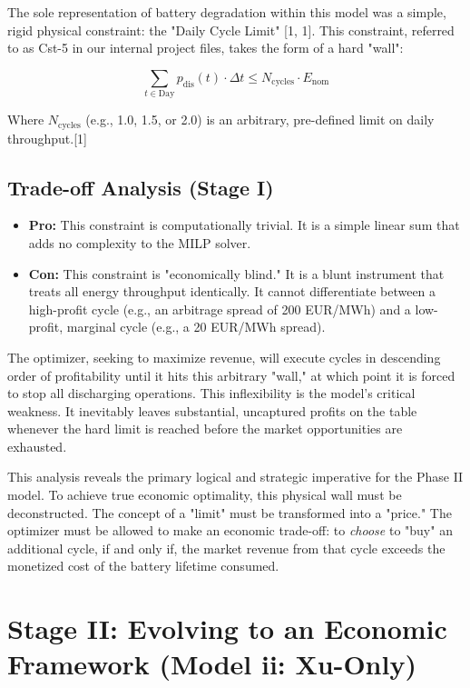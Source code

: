 \documentclass[11pt, a4paper]{article}
\begin{document}
The sole representation of battery degradation within this model was a simple, rigid physical constraint: the "Daily Cycle Limit" [1, 1]. This constraint, referred to as Cst-5 in our internal project files, takes the form of a hard "wall":

\begin{equation}
 \sum_{t \in \text{Day}} p_{\mathrm{dis}}(t) \cdot \Delta t \le N_{\mathrm{cycles}} \cdot E_{\mathrm{nom}}
\end{equation}

Where $N_{\mathrm{cycles}}$ (e.g., 1.0, 1.5, or 2.0) is an arbitrary, pre-defined limit on daily throughput.[1]

\subsection{Trade-off Analysis (Stage I)}

\begin{itemize}
    \item \textbf{Pro:} This constraint is computationally trivial. It is a simple linear sum that adds no complexity to the MILP solver.
    \item \textbf{Con:} This constraint is "economically blind." It is a blunt instrument that treats all energy throughput identically. It cannot differentiate between a high-profit cycle (e.g., an arbitrage spread of 200 EUR/MWh) and a low-profit, marginal cycle (e.g., a 20 EUR/MWh spread).
\end{itemize}

The optimizer, seeking to maximize revenue, will execute cycles in descending order of profitability until it hits this arbitrary "wall," at which point it is forced to stop all discharging operations. This inflexibility is the model's critical weakness. It inevitably leaves substantial, uncaptured profits on the table whenever the hard limit is reached before the market opportunities are exhausted.

This analysis reveals the primary logical and strategic imperative for the Phase II model. To achieve true economic optimality, this physical wall must be deconstructed. The concept of a "limit" must be transformed into a "price." The optimizer must be allowed to make an economic trade-off: to \textit{choose} to "buy" an additional cycle, if and only if, the market revenue from that cycle exceeds the monetized cost of the battery lifetime consumed.

\section{Stage II: Evolving to an Economic Framework (Model ii: Xu-Only)}
\end{document}

